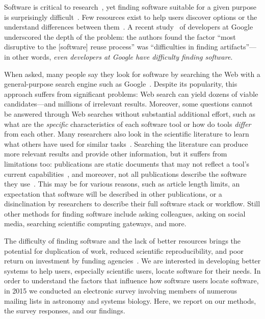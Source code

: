 \documentclass{casicswhitepaper}
\begin{document}
Software is critical to research~, yet finding software suitable for a given purpose is surprisingly difficult~.  Few resources exist to help users discover options or the understand differences between them~\cite{white2014nih}.  A recent study~\cite{bauer2014exploratory} of developers at Google underscored the depth of the problem: the authors found the factor ``most disruptive to the [software] reuse process'' was ``difficulties in finding artifacts''---in other words, \emph{even developers at Google have difficulty finding software}.

When asked, many people say they look for software by searching the Web with a general-purpose search engine such as Google~\cite{samadi_2004, umarji_2008}.  Despite its popularity, this approach suffers from significant problems: Web search can yield dozens of viable candidates---and millions of irrelevant results.  Moreover, some questions cannot be answered through Web searches without substantial additional effort, such as what are the \emph{specific} characteristics of each software tool or how do tools \emph{differ} from each other.  Many researchers also look in the scientific literature to learn what others have used for similar tasks~\cite{lawrence2015science, joppa2013troubling}.  Searching the literature can produce more relevant results and provide other information, but it suffers from limitations too: publications are static documents that may not reflect a tool's current capabilities~\cite{wren_2004}, and moreover, not all publications describe the software they use~\cite{howison2015software}.  This may be for various reasons, such as article length limits, an expectation that software will be described in other publications, or a disinclination by researchers to describe their full software stack or workflow.  Still other methods for finding software include asking colleagues, asking on social media, searching scientific computing gateways, and more.

The difficulty of finding software and the lack of better resources brings the potential for duplication of work, reduced scientific reproducibility, and poor return on investment by funding agencies~\citep{cannata_2005, national2003sharing, crook2013learning, poisot2015best, white2014nih, niemeyer2016challenge}.  We are interested in developing better systems to help users, especially scientific users, locate software for their needs.  In order to understand the factors that influence how software users locate software, in 2015 we conducted an electronic survey involving members of numerous mailing lists in astronomy and systems biology.  Here, we report on our methods, the survey responses, and our findings.
\end{document}
